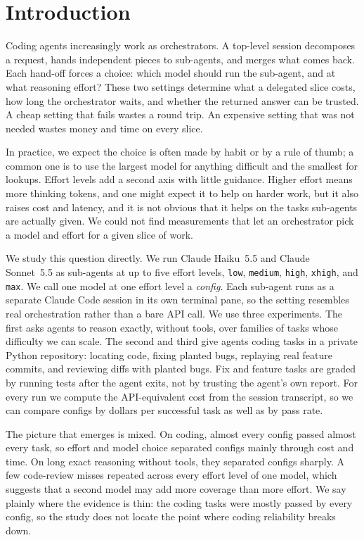 \section{Introduction}\label{sec:introduction}

Coding agents increasingly work as orchestrators. A top-level session decomposes a request, hands independent pieces to sub-agents, and merges what comes back. Each hand-off forces a choice: which model should run the sub-agent, and at what reasoning effort? These two settings determine what a delegated slice costs, how long the orchestrator waits, and whether the returned answer can be trusted. A cheap setting that fails wastes a round trip. An expensive setting that was not needed wastes money and time on every slice.

In practice, we expect the choice is often made by habit or by a rule of thumb; a common one is to use the largest model for anything difficult and the smallest for lookups. Effort levels add a second axis with little guidance. Higher effort means more thinking tokens, and one might expect it to help on harder work, but it also raises cost and latency, and it is not obvious that it helps on the tasks sub-agents are actually given. We could not find measurements that let an orchestrator pick a model and effort for a given slice of work.

We study this question directly. We run Claude Haiku~5.5 and Claude Sonnet~5.5 as sub-agents at up to five effort levels, \texttt{low}, \texttt{medium}, \texttt{high}, \texttt{xhigh}, and \texttt{max}. We call one model at one effort level a \emph{config}. Each sub-agent runs as a separate Claude Code session in its own terminal pane, so the setting resembles real orchestration rather than a bare API call. We use three experiments. The first asks agents to reason exactly, without tools, over families of tasks whose difficulty we can scale. The second and third give agents coding tasks in a private Python repository: locating code, fixing planted bugs, replaying real feature commits, and reviewing diffs with planted bugs. Fix and feature tasks are graded by running tests after the agent exits, not by trusting the agent's own report. For every run we compute the API-equivalent cost from the session transcript, so we can compare configs by dollars per successful task as well as by pass rate.

The picture that emerges is mixed. On coding, almost every config passed almost every task, so effort and model choice separated configs mainly through cost and time. On long exact reasoning without tools, they separated configs sharply. A few code-review misses repeated across every effort level of one model, which suggests that a second model may add more coverage than more effort. We say plainly where the evidence is thin: the coding tasks were mostly passed by every config, so the study does not locate the point where coding reliability breaks down.

